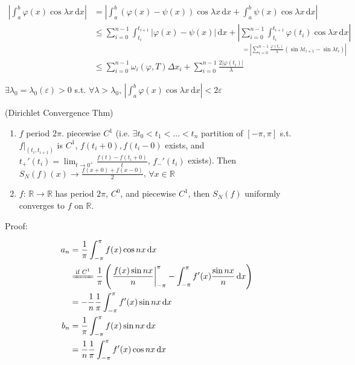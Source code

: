 \begin{align*}
    \left|\int_a^b\varphi(x)\cos\lambda x\,\mathrm{d}x\right|
     & =\left|\int_a^b\left(\varphi(x)-\psi(x)\right)\cos\lambda x\,\mathrm{d}x+\int_a^b\psi(x)\cos\lambda x\,\mathrm{d}x\right|                                                                                                                                                                \\
     & \leq\sum_{i=0}^{n-1}\int_{t_i}^{t_{i+1}}\left|\varphi(x)-\psi(x)\right|\,\mathrm{d}x+\underset{=\left|\sum_{i=0}^{n-1}\frac{\varphi(t_i)}{\lambda}(\sin\lambda t_{i+1}-\sin\lambda t_i)\right|}{\left|\sum_{i=0}^{n-1}\int_{t_i}^{t_{i+1}}\varphi(t_i)\cos\lambda x\,\mathrm{d}x\right|} \\
     & \leq\sum_{i=0}^{n-1}\omega_i(\varphi,T)\Delta x_i+\sum_{i=0}^{n-1}\frac{2\left|\varphi(t_i)\right|}{\lambda}
\end{align*}

$\exists\lambda_0=\lambda_0(\varepsilon)>0$ s.t. $\forall\lambda>\lambda_0$, $\left|\int_a^b\varphi(x)\cos\lambda x\,\mathrm{d}x\right|<2\varepsilon$

(Dirichlet Convergence Thm)

\begin{enumerate}[label=(\Roman*)]
    \item $f$ period $2\pi$. piecewise $C^1$ (i.e. $\exists t_0<t_1<\dots<t_n$ partition of $[-\pi,\pi]$ s.t. $f|_{(t_i,t_{i+1})}$ is $C^1$, $f(t_i+0),f(t_i-0)$ exists, and $t_+'(t_i)=\lim_{t\to 0^+}\frac{f(t)-f(t_i+0)}{t}$, $f_-'(t_i)$ exists). Then $S_N(f)(x)\to\frac{f(x+0)+f(x-0)}{2}$, $\forall x\in\mathbb{R}$
    \item $f:\,\mathbb{R}\to\mathbb{R}$ has period $2\pi$, $C^0$, and piecewise $C^1$, then $S_N(f)$ uniformly converges to $f$ on $\mathbb{R}$.
\end{enumerate}

Proof:

\begin{align*}
    a_n
     & =\frac{1}{\pi}\int_{-\pi}^{\pi}f(x)\cos nx\,\mathrm{d}x                                                                                                  \\
     & \xlongequal{\text{if }C^1}\frac{1}{\pi}\left(\left.\frac{f(x)\sin nx}{n}\right|_{-\pi}^{\pi}-\int_{-\pi}^{\pi}f'(x)\frac{\sin nx}{n}\,\mathrm{d}x\right) \\
     & =-\frac{1}{n}\frac{1}{\pi}\int_{-\pi}^{\pi}f'(x)\sin nx\,\mathrm{d}x                                                                                     \\
    b_n
     & =\frac{1}{\pi}\int_{-\pi}^{\pi}f(x)\sin nx\,\mathrm{d}x                                                                                                  \\
     & =\frac{1}{n}\frac{1}{\pi}\int_{-\pi}^{\pi}f'(x)\cos nx\,\mathrm{d}x
\end{align*}

